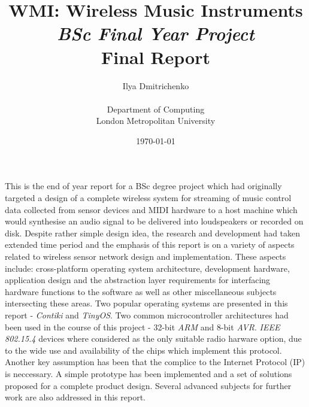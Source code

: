 
\title{WMI: Wireless Music Instruments\\ \emph{BSc Final Year Project} \\ Final Report}
\author{Ilya Dmitrichenko \\ \\ Department of Computing\\ London Metropolitan University}

\date{\today}




\maketitle


\abstract
{

   This is the end of year report for a BSc degree project which had originally
   targeted a design of a complete wireless system for streaming of music control
   data collected from sensor devices and MIDI hardware to a host machine which
   would synthesise an audio signal to be delivered into loudspeakers or recorded
   on disk. Despite rather simple design idea, the research and development had
   taken extended time period and the emphasis of this report is on a variety of
   aspects related to wireless sensor network design and implementation. These
   aspects include: cross-platform operating system architecture, development
   hardware, application design and the abstraction layer requirements for
   interfacing hardware functions to the software as well as other miscellaneous
   subjects intersecting these areas. Two popular operating systems are presented
   in this report - \emph{Contiki} and \emph{TinyOS}. Two common microcontroller
   architectures had been used in the course of this project - 32-bit \emph{ARM}
   and 8-bit \emph{AVR}. \emph{IEEE 802.15.4} devices where considered as the
   only suitable radio harware option, due to the wide use and availability of
   the chips which implement this protocol. Another key assumption has been that
   the complice to the Internet Protocol (IP) is neccessary. A simple prototype
   has been implemented and a set of solutions proposed for a complete product
   design. Several advanced subjects for further work are also addressed in this
   report.

}

\tableofcontents
\listoffigures


